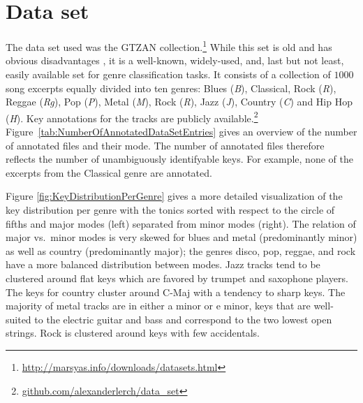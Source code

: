 \documentclass{article}
\begin{document}
\section{Data set}\label{sec:dataset}
The data set used was the GTZAN collection.\footnote{\url{http://marsyas.info/downloads/datasets.html}} While this set is old and has obvious disadvantages \cite{sturm_analysis_2012}, it is a well-known, widely-used, and, last but not least, easily available set for genre classification tasks. It consists of a collection of $1000$ song excerpts equally divided into ten genres: Blues (\textit{B}), Classical, Rock (\textit{R}), Reggae (\textit{Rg}), Pop (\textit{P}), Metal (\textit{M}), Rock (\textit{R}), Jazz (\textit{J}), Country (\textit{C}) and Hip Hop (\textit{H}). 
Key annotations for the tracks are publicly available.\footnote{\url{github.com/alexanderlerch/data_set}}
 Figure~\ref{tab:NumberOfAnnotatedDataSetEntries} gives an overview of the number of annotated files and their mode. The number of annotated files therefore reflects the number of unambiguously identifyable keys.
For example, none of the excerpts from the Classical genre are annotated. 

Figure \ref{fig:KeyDistributionPerGenre} gives a more detailed visualization of the key distribution per genre with the tonics sorted with respect to the circle of fifths and major modes (left) separated from minor modes (right). 
The relation of major vs.\ minor modes is very skewed for blues and metal (predominantly minor) as well as country (predominantly major); the genres disco, pop, reggae, and rock have a more balanced distribution between modes. Jazz tracks tend to be clustered around flat keys which are favored by trumpet and saxophone players. The keys for country cluster around C-Maj with a tendency to sharp keys. The majority of metal tracks are in either a minor or e minor, keys that are well-suited to the electric guitar and bass and correspond to the two lowest open strings. Rock is clustered around keys with few accidentals.

\end{document}
